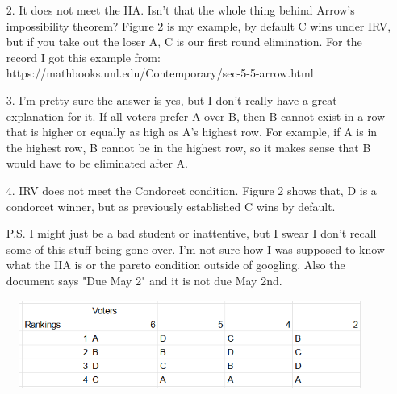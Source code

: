 \documentclass[16pt]{article}
\begin{document}
\begin{enumerate}
\begin{enumerate}
            \item[2.] It does not meet the IIA. Isn't that the whole thing behind Arrow's impossibility theorem? Figure 2 is my example, by default C wins under IRV, but if you take out the loser A, C is our first round elimination. For the record I got this example from: https://mathbooks.unl.edu/Contemporary/sec-5-5-arrow.html 

            \item[3.] I'm pretty sure the answer is yes, but I don't really have a great explanation for it. If all voters prefer A over B, then B cannot exist in a row that is higher or equally as high as A's highest row. For example, if A is in the highest row, B cannot be in the highest row, so it makes sense that B would have to be eliminated after A.

            \item[4.] IRV does not meet the Condorcet condition. Figure 2 shows that, D is a condorcet winner, but as previously established C wins by default.

            \item[P.S.] I might just be a bad student or inattentive, but I swear I don't recall some of this stuff being gone over. I'm not sure how I was supposed to know what the IIA is or the pareto condition outside of googling. Also the document says "Due May 2" and it is not due May 2nd.
            \end{enumerate}
            
        
    \end{enumerate}
    \begin{figure}
            \centering
            \caption{}
            \includegraphics[width=1\linewidth]{image2.png}
            \label{Figure 2}
        \end{figure}
\end{document}
